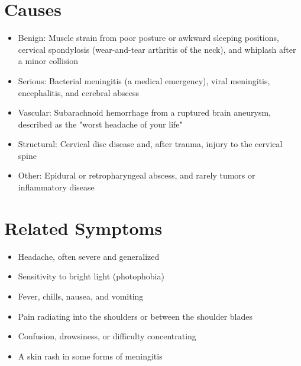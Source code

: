 \section*{Causes}
\begin{itemize}
  \item Benign: Muscle strain from poor posture or awkward sleeping positions, cervical spondylosis (wear-and-tear arthritis of the neck), and whiplash after a minor collision
  \item Serious: Bacterial meningitis (a medical emergency), viral meningitis, encephalitis, and cerebral abscess
  \item Vascular: Subarachnoid hemorrhage from a ruptured brain aneurysm, described as the "worst headache of your life"
  \item Structural: Cervical disc disease and, after trauma, injury to the cervical spine
  \item Other: Epidural or retropharyngeal abscess, and rarely tumors or inflammatory disease
\end{itemize}

\section*{Related Symptoms}
\begin{itemize}
  \item Headache, often severe and generalized
  \item Sensitivity to bright light (photophobia)
  \item Fever, chills, nausea, and vomiting
  \item Pain radiating into the shoulders or between the shoulder blades
  \item Confusion, drowsiness, or difficulty concentrating
  \item A skin rash in some forms of meningitis
\end{itemize}

